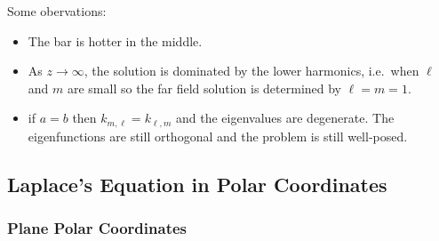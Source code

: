 \documentclass[a4paper]{article}
\begin{document}
Some obervations:
\begin{itemize}
\item The bar is hotter in the middle.
\item As \(z \to \infty\), the solution is dominated by the lower harmonics, i.e.\ when \(\ell\) and \(m\) are small so the far field solution is determined by \(\ell = m = 1\).
\item if \(a = b\) then \(k_{m, \ell} = k_{\ell, m}\) and the eigenvalues are degenerate. The eigenfunctions are still orthogonal and the problem is still well-posed.
\end{itemize}

\subsection{Laplace's Equation in Polar Coordinates}

\subsubsection{Plane Polar Coordinates}
\end{document}
